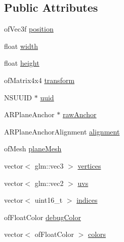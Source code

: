 \subsection*{Public Attributes}
\begin{DoxyCompactItemize}
\item 
of\+Vec3f \mbox{\hyperlink{struct_a_r_objects_1_1_plane_anchor_object_a1e91b9c289ed6a8379e8106479b30650}{position}}
\item 
float \mbox{\hyperlink{struct_a_r_objects_1_1_plane_anchor_object_a66571f63611c3fe8c8161c18b5d163cc}{width}}
\item 
float \mbox{\hyperlink{struct_a_r_objects_1_1_plane_anchor_object_a7114f6bc16cf36662c1a73e34d2d2314}{height}}
\item 
of\+Matrix4x4 \mbox{\hyperlink{struct_a_r_objects_1_1_plane_anchor_object_a683ab536baa0f5b81b11deeca121ce5b}{transform}}
\item 
N\+S\+U\+U\+ID $\ast$ \mbox{\hyperlink{struct_a_r_objects_1_1_plane_anchor_object_ab20601adc6ffd5698f0c91acf861c92b}{uuid}}
\item 
A\+R\+Plane\+Anchor $\ast$ \mbox{\hyperlink{struct_a_r_objects_1_1_plane_anchor_object_a4d6b3acc9e0a17fe3f5357f99a176101}{raw\+Anchor}}
\item 
A\+R\+Plane\+Anchor\+Alignment \mbox{\hyperlink{struct_a_r_objects_1_1_plane_anchor_object_ab7a90a7ff3d371f52d5d17ad43dbf455}{alignment}}
\item 
of\+Mesh \mbox{\hyperlink{struct_a_r_objects_1_1_plane_anchor_object_a4e969735f7f7c20dbd821179731b3de0}{plane\+Mesh}}
\item 
vector$<$ glm\+::vec3 $>$ \mbox{\hyperlink{struct_a_r_objects_1_1_plane_anchor_object_a56f396287d04ad40aed3284306e92ad6}{vertices}}
\item 
vector$<$ glm\+::vec2 $>$ \mbox{\hyperlink{struct_a_r_objects_1_1_plane_anchor_object_a9359d0197b40bb929452047317b2d86c}{uvs}}
\item 
vector$<$ uint16\+\_\+t $>$ \mbox{\hyperlink{struct_a_r_objects_1_1_plane_anchor_object_a25688480cf760eafe5625c62006f8461}{indices}}
\item 
of\+Float\+Color \mbox{\hyperlink{struct_a_r_objects_1_1_plane_anchor_object_ad6a82e20d0123eca70172d3ea4d3c924}{debug\+Color}}
\item 
vector$<$ of\+Float\+Color $>$ \mbox{\hyperlink{struct_a_r_objects_1_1_plane_anchor_object_a39036e2966bc7a6c9cec88f5689cd65b}{colors}}
\end{DoxyCompactItemize}


